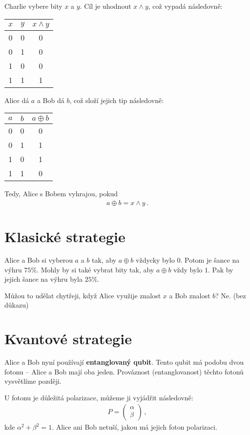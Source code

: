 \documentclass[10pt,a4paper]{article}
\begin{document}
Charlie vybere bity $x$ a $y$.
Cíl je uhodnout $x\land y$, což vypadá následovně:
\begin{center}
\begin{tabular}{ c | c || c }
$x$ & $y$ & $x \land y$ \\ 
\hline
 0 & 0 & 0 \\
 0 & 1 & 0 \\
 1 & 0 & 0 \\
 1 & 1 & 1
\end{tabular}
\end{center}

Alice dá $a$ a Bob dá $b$, což složí jejich tip následovně:
\begin{center}
\begin{tabular}{ c | c || c }
$a$ & $b$ & $a \oplus b$ \\ 
\hline
 0 & 0 & 0 \\
 0 & 1 & 1 \\
 1 & 0 & 1 \\
 1 & 1 & 0
\end{tabular}
\end{center}

Tedy, Alice s Bobem vyhrajou, pokud
\begin{align}
a \oplus b = x \land y \,.
\end{align}

\section{Klasické strategie}

Alice a Bob si vyberou $a$ a $b$ tak, aby $a\oplus b$ vždycky bylo $0$.
Potom je šance na výhru $75 \%$.
Mohly by si také vybrat bity tak, aby $a\oplus b$ vždy bylo $1$.
Pak by jejich šance na výhru byla $25 \%$.

Můžou to udělat chytřeji, když Alice využije znalost $x$ a Bob znalost $b$?
Ne. (bez důkazu)

\section{Kvantové strategie}

Alice a Bob nyní používají \textbf{entanglovaný qubit}. Tento qubit má podobu
dvou fotonu -- Alice a Bob mají oba jeden. Prováznost (entanglovanost) těchto
fotonů vysvětlíme později.

U fotonu je důležitá polarizace, můžeme ji vyjádřit následovně:
\begin{align}
P =
\begin{pmatrix}
\alpha \\
\beta
\end{pmatrix}
\,,
\end{align}
%
kde $\alpha^2 + \beta^2 = 1$. Alice ani Bob netuší, jakou má jejich foton polarizaci.
\end{document}
